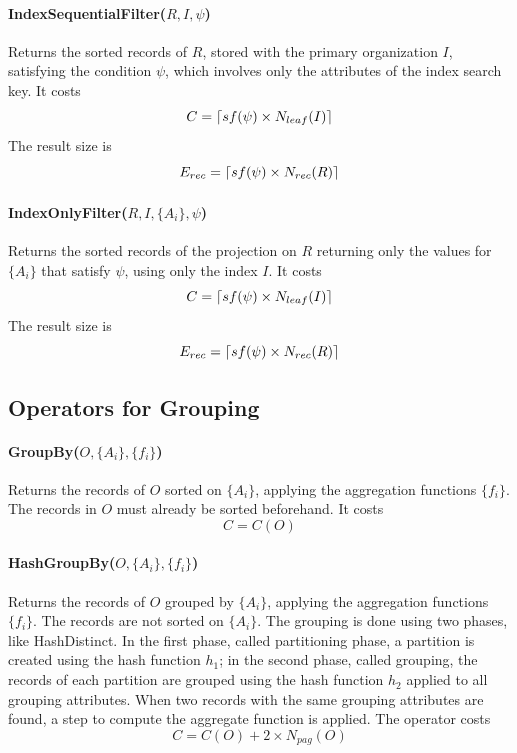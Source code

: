 \paragraph{IndexSequentialFilter($R,I,\psi$)}
Returns the sorted records of $R$, stored with the primary organization $I$, satisfying the condition $\psi$, which involves only the attributes of the index search key. It costs
\begin{equation*}
    C = \left\lceil sf(\psi) \times N_{leaf}(I)\right\rceil
\end{equation*}
The result size is
\begin{equation*}
    E_{rec} = \left\lceil sf(\psi) \times N_{rec}(R)\right\rceil
\end{equation*}

\paragraph{IndexOnlyFilter($R, I, \{A_i\}, \psi$)}
Returns the sorted records of the projection on $R$ returning only the values for $\{A_i\}$ that satisfy $\psi$, using only the index $I$. It costs
\begin{equation*}
    C = \left\lceil sf(\psi) \times N_{leaf}(I)\right\rceil
\end{equation*}
The result size is
\begin{equation*}
    E_{rec} = \left\lceil sf(\psi) \times N_{rec}(R)\right\rceil
\end{equation*}

\subsection{Operators for Grouping}

\paragraph{GroupBy($O, \{A_i\}, \{f_i\}$)}
Returns the records of $O$ sorted on $\{A_i\}$, applying the aggregation functions $\{f_i\}$. The records in $O$ must already be sorted beforehand. It costs
\begin{equation*}
    C = C(O)
\end{equation*}

\paragraph{HashGroupBy($O, \{A_i\}, \{f_i\}$)}
Returns the records of $O$ grouped by $\{A_i\}$, applying the aggregation functions $\{f_i\}$. The records are not sorted on $\{A_i\}$. The grouping is done using two phases, like HashDistinct. In the first phase, called partitioning phase, a partition is created using the hash function $h_1$; in the second phase, called grouping, the records of each partition are grouped using the hash function $h_2$ applied to all grouping attributes. When two records with the same grouping attributes are found, a step to compute the aggregate function is applied. The operator costs
\begin{equation*}
    C = C(O) + 2 \times N_{pag}(O)
\end{equation*}

